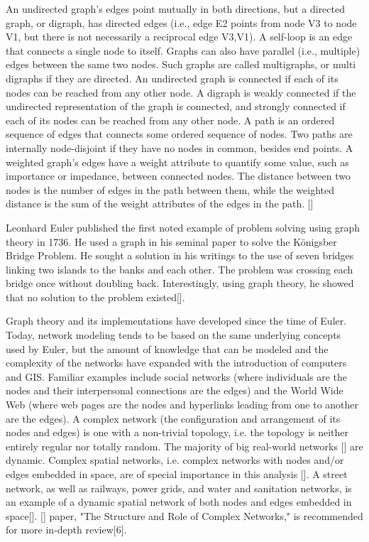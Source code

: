 An undirected graph's edges point mutually in both directions, but a directed graph, or digraph, has directed edges (i.e., edge E2 points from node V3 to node V1, but there is not necessarily a reciprocal edge V3,V1). A self-loop is an edge that connects a single node to itself. Graphs can also have parallel (i.e., multiple) edges between the same two nodes. Such graphs are called multigraphs, or multi digraphs if they are directed. An undirected graph is connected if each of its nodes can be reached from any other node. A digraph is weakly connected if the undirected representation of the graph is connected, and strongly connected if each of its nodes can be reached from any other node. A path is an ordered sequence of edges that connects some ordered sequence of nodes. Two paths are internally node-disjoint if they have no nodes in common, besides end points. A weighted graph's edges have a weight attribute to quantify some value, such as importance or impedance, between connected nodes. The distance between two nodes is the number of edges in the path between them, while the weighted distance is the sum of the weight attributes of the edges in the path. [\cite{Boeing:2017}]

Leonhard Euler published the first noted example of problem solving using graph theory in 1736. He used a graph in his seminal paper to solve the Königsber Bridge Problem. He sought a solution in his writings to the use of seven bridges linking two islands to the banks and each other. The problem was crossing each bridge once without doubling back. Interestingly, using graph theory, he showed that no solution to the problem existed[\cite{Duo:2002}]. 

Graph theory and its implementations have developed since the time of Euler. Today, network modeling tends to be based on the same underlying concepts used by Euler, but the amount of knowledge that can be modeled and the complexity of the networks have expanded with the introduction of computers and GIS. Familiar examples include social networks (where individuals are the nodes and their interpersonal connections are the edges) and the World Wide Web (where web pages are the nodes and hyperlinks leading from one to another are the edges). A complex network (the configuration and arrangement of its nodes and edges) is one with a non-trivial topology, i.e. the topology is neither entirely regular nor totally random. The majority of big real-world networks [\cite{Newman:2010}] are dynamic. Complex spatial networks, i.e. complex networks with nodes and/or edges embedded in space, are of special importance in this analysis [\cite{OSullivan:2014}]. A street network, as well as railways, power grids, and water and sanitation networks, is an example of a dynamic spatial network of both nodes and edges embedded in space[\cite{Barthelemy:2011}]. [\cite{Newman:2003}] paper, "The Structure and Role of Complex Networks," is recommended for more in-depth review[6].

